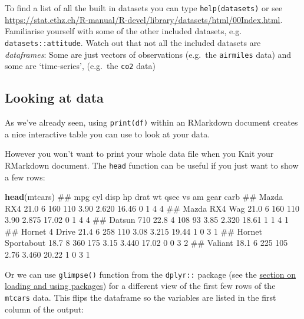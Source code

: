 \documentclass[]{article}
\newenvironment{Shaded}{\begin{snugshade}}{\end{snugshade}}
\newcommand{\KeywordTok}[1]{\textcolor[rgb]{0.13,0.29,0.53}{\textbf{#1}}}
\newcommand{\NormalTok}[1]{#1}
\theoremstyle{definition}
\theoremstyle{definition}
\theoremstyle{definition}
\theoremstyle{remark}
\begin{document}
{To find a list of all the built in datasets you can type
\texttt{help(datasets)} or see
\url{https://stat.ethz.ch/R-manual/R-devel/library/datasets/html/00Index.html}.
Familiarise yourself with some of the other included datasets, e.g.
\texttt{datasets::attitude}. Watch out that not all the included
datasets are \emph{dataframes}: Some are just vectors of observations
(e.g.~the \texttt{airmiles} data) and some are `time-series', (e.g.~the
\texttt{co2} data)}

\subsection*{Looking at data}\label{looking-at-data}

As we've already seen, using \texttt{print(df)} within an RMarkdown
document creates a nice interactive table you can use to look at your
data.

However you won't want to print your whole data file when you Knit your
RMarkdown document. The \texttt{head} function can be useful if you just
want to show a few rows:

\begin{Shaded}
\begin{Highlighting}[]
\KeywordTok{head}\NormalTok{(mtcars)}
\NormalTok{##                    mpg cyl disp  hp drat    wt  qsec vs am gear carb}
\NormalTok{## Mazda RX4         21.0   6  160 110 3.90 2.620 16.46  0  1    4    4}
\NormalTok{## Mazda RX4 Wag     21.0   6  160 110 3.90 2.875 17.02  0  1    4    4}
\NormalTok{## Datsun 710        22.8   4  108  93 3.85 2.320 18.61  1  1    4    1}
\NormalTok{## Hornet 4 Drive    21.4   6  258 110 3.08 3.215 19.44  1  0    3    1}
\NormalTok{## Hornet Sportabout 18.7   8  360 175 3.15 3.440 17.02  0  0    3    2}
\NormalTok{## Valiant           18.1   6  225 105 2.76 3.460 20.22  1  0    3    1}
\end{Highlighting}
\end{Shaded}

Or we can use \texttt{glimpse()} function from the \texttt{dplyr::}
package (see the \protect\hyperlink{packages}{section on loading and
using packages}) for a different view of the first few rows of the
\texttt{mtcars} data. This flips the dataframe so the variables are
listed in the first column of the output:
\end{document}
